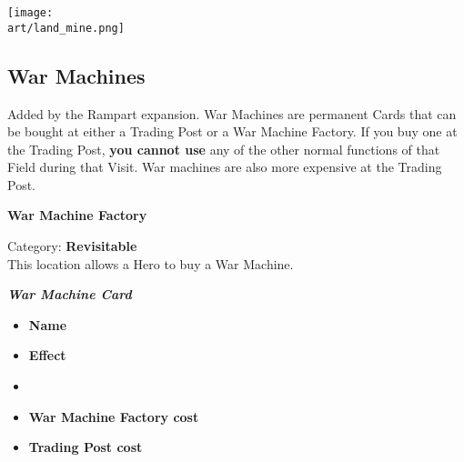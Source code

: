 \begin{multicols*}{2}

\begin{center}
  \texttt{[image: \\art/land\_mine.png]}
\end{center}

\subsection*{War Machines}
Added by the Rampart expansion.
War Machines are permanent Cards that can be bought at either a Trading Post or a War Machine Factory.
If you buy one at the Trading Post, \textbf{you cannot use} any of the other normal functions of that Field during that Visit.
War machines are also more expensive at the Trading Post.\par
\medskip
\begin{minipage}[h]{\linewidth}
  \begin{center}
    \textbf{War Machine Factory}\medskip
  \end{center}
  \footnotesize{Category: \textbf{Revisitable}\\This location allows a Hero to buy a War Machine.}
\end{minipage}

\bigskip

\begin{minipage}[h]{\linewidth}
  \vspace{0pt}
  \centering
  \begin{scriptsize}
  \end{scriptsize}
  \break
  \footnotesize{\textbf{\textit{\textcolor{darkcandyapplered}{War Machine Card}}}}
  \scriptsize
  \begin{multicols}{2}
    \begin{itemize}
      \item[\textbf{1.}] \textbf{Name}
      \item[\textbf{2.}] \textbf{Effect}
      \item[\textbf{\phantom{.}}] \phantom{.}
      \item[\textbf{3.}] \textbf{War Machine Factory cost}
      \item[\textbf{4.}] \textbf{Trading Post cost}
    \end{itemize}
  \end{multicols}
\end{minipage}


\end{multicols*}
